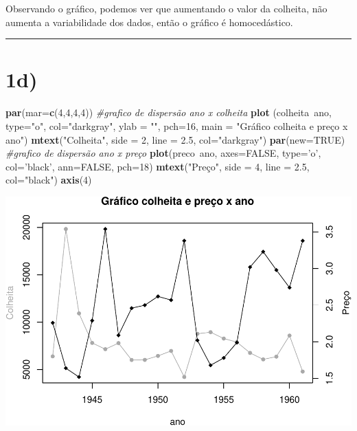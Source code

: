 \documentclass[11pt,]{article}
\makeatletter
\newenvironment{Shaded}{\begin{snugshade}}{\end{snugshade}}
\newcommand{\KeywordTok}[1]{\textcolor[rgb]{0.13,0.29,0.53}{\textbf{{#1}}}}
\newcommand{\DataTypeTok}[1]{\textcolor[rgb]{0.13,0.29,0.53}{{#1}}}
\newcommand{\DecValTok}[1]{\textcolor[rgb]{0.00,0.00,0.81}{{#1}}}
\newcommand{\FloatTok}[1]{\textcolor[rgb]{0.00,0.00,0.81}{{#1}}}
\newcommand{\StringTok}[1]{\textcolor[rgb]{0.31,0.60,0.02}{{#1}}}
\newcommand{\CommentTok}[1]{\textcolor[rgb]{0.56,0.35,0.01}{\textit{{#1}}}}
\newcommand{\OtherTok}[1]{\textcolor[rgb]{0.56,0.35,0.01}{{#1}}}
\newcommand{\NormalTok}[1]{{#1}}
\def\maxwidth{\ifdim\Gin@nat@width>\linewidth\linewidth
\else\Gin@nat@width\fi}
\let\Oldincludegraphics\includegraphics
\renewcommand{\includegraphics}[1]{\Oldincludegraphics[width=\maxwidth]{#1}}
\makeatother
\begin{document}
Observando o gráfico, podemos ver que aumentando o valor da colheita,
não aumenta a variabilidade dos dados, então o gráfico é homocedástico.

\begin{center}\rule{0.5\linewidth}{\linethickness}\end{center}

\section{1d)}\label{d}

\begin{Shaded}
\begin{Highlighting}[]
\KeywordTok{par}\NormalTok{(}\DataTypeTok{mar=}\KeywordTok{c}\NormalTok{(}\DecValTok{4}\NormalTok{,}\DecValTok{4}\NormalTok{,}\DecValTok{4}\NormalTok{,}\DecValTok{4}\NormalTok{))}
\CommentTok{#grafico de dispersão ano x colheita}
\KeywordTok{plot} \NormalTok{(colheita~ano, }\DataTypeTok{type=}\StringTok{"o"}\NormalTok{, }\DataTypeTok{col=}\StringTok{"darkgray"}\NormalTok{, }\DataTypeTok{ylab =} \StringTok{""}\NormalTok{, }\DataTypeTok{pch=}\DecValTok{16}\NormalTok{,}
      \DataTypeTok{main =} \StringTok{"Gráfico colheita e preço x ano"}\NormalTok{)}
\KeywordTok{mtext}\NormalTok{(}\StringTok{"Colheita"}\NormalTok{, }\DataTypeTok{side =} \DecValTok{2}\NormalTok{, }\DataTypeTok{line =} \FloatTok{2.5}\NormalTok{, }\DataTypeTok{col=}\StringTok{"darkgray"}\NormalTok{)}
\KeywordTok{par}\NormalTok{(}\DataTypeTok{new=}\OtherTok{TRUE}\NormalTok{)}
\CommentTok{#grafico de dispersão ano x preço}
\KeywordTok{plot}\NormalTok{(preco~ano, }\DataTypeTok{axes=}\OtherTok{FALSE}\NormalTok{, }\DataTypeTok{type=}\StringTok{'o'}\NormalTok{, }\DataTypeTok{col=}\StringTok{'black'}\NormalTok{, }\DataTypeTok{ann=}\OtherTok{FALSE}\NormalTok{, }\DataTypeTok{pch=}\DecValTok{18}\NormalTok{)}
\KeywordTok{mtext}\NormalTok{(}\StringTok{"Preço"}\NormalTok{, }\DataTypeTok{side =} \DecValTok{4}\NormalTok{, }\DataTypeTok{line =} \FloatTok{2.5}\NormalTok{, }\DataTypeTok{col=}\StringTok{"black"}\NormalTok{)}
\KeywordTok{axis}\NormalTok{(}\DecValTok{4}\NormalTok{)}
\end{Highlighting}
\end{Shaded}

\includegraphics{versaofinal_lista3_files/figure-latex/unnamed-chunk-5-1.pdf}
\end{document}
